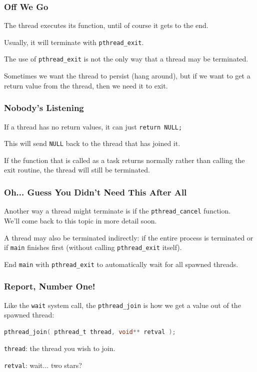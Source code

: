 \begin{frame}
\frametitle{Off We Go}

The thread executes its function, until of course it gets to the end. 

Usually, it will terminate with \texttt{pthread\_exit}. 

The use of \texttt{pthread\_exit} is not the only way that a thread may be terminated. 

Sometimes we want the thread to persist (hang around), but if we want to get a return value from the thread, then we need it to exit. 

\end{frame}


\begin{frame}
\frametitle{Nobody's Listening}

If a thread has no return values, it can just \texttt{return NULL;} 

This will send \texttt{NULL} back to the thread that has joined it. 

If the function that is called as a task returns normally rather than calling the exit routine, the thread will still be terminated. 

\end{frame}

\begin{frame}
\frametitle{Oh... Guess You Didn't Need This After All}

Another way a thread might terminate is if the \texttt{pthread\_cancel} function.\\
\quad We'll come back to this topic in more detail soon.

A thread may also be terminated indirectly: if the entire process is terminated or if \texttt{main} finishes first (without calling \texttt{pthread\_exit} itself).

End \texttt{main} with \texttt{pthread\_exit} to automatically wait for all spawned threads.

\end{frame}


\begin{frame}[fragile]
\frametitle{Report, Number One!}

 Like the \texttt{wait} system call, the \texttt{pthread\_join} is how we get a value out of the spawned thread:

\begin{lstlisting}[language=C]
pthread_join( pthread_t thread, void** retval );
\end{lstlisting}

\texttt{thread}: the thread you wish to join.

\texttt{retval}: wait... two stars?

\end{frame}

